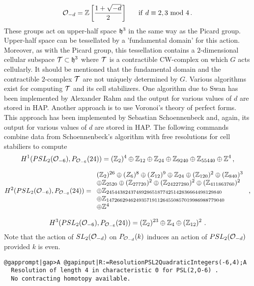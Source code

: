 \documentclass[a4paper,11pt]{report}
\begin{document}
{{\[{\cal O}_{-d} = \mathbb Z\left[\frac{1+\sqrt{-d}}{2}\right]~~~~~ {\rm if~} d
\equiv 2,3 {\rm ~mod~} 4\, .\]
 These groups act on upper-half space ${\frak h}^3$ in the same way as the Picard group. Upper-half space can be tessellated by a
'fundamental domain' for this action. Moreover, as with the Picard group, this
tessellation contains a $2$-dimensional cellular subspace ${\cal T}\subset {\frak h}^3$ where ${\cal T}$ is a contractible CW-complex on which $G$ acts cellularly. It should be mentioned that the fundamental domain and the
contractible $2$-complex ${\cal T}$ are not uniquely determined by $G$. Various algorithms exist for computing ${\cal T}$ and its cell stabilizers. One algorithm due to Swan \cite{swan} has been implemented by Alexander Rahm \cite{rahmthesis} and the output for various values of $d$ are stored in HAP. Another approach is to use Voronoi's theory of perfect
forms. This approach has been implemented by Sebastian Schoennenbeck \cite{schoennenbeck} and, again, its output for various values of $d$ are stored in HAP. The following commands combine data from Schoennenbeck's
algorithm with free resolutions for cell stabiliers to compute 
\[H^1(PSL_2({\cal O}_{-6}),P_{{\cal O}_{-6}}(24)) = (\mathbb Z_2)^4 \oplus
\mathbb Z_{12} \oplus \mathbb Z_{24} \oplus \mathbb Z_{9240} \oplus \mathbb
Z_{55440} \oplus \mathbb Z^4\,, \]
 
\[H^2(PSL_2({\cal O}_{-6}),P_{{\cal O}_{-6}}(24)) = \begin{array}{l} (\mathbb
Z_2)^{26} \oplus \mathbb (Z_{6})^8 \oplus \mathbb (Z_{12})^{9} \oplus \mathbb
Z_{24} \oplus (\mathbb Z_{120})^2 \oplus (\mathbb Z_{840})^3\\ \oplus \mathbb
Z_{2520} \oplus (\mathbb Z_{27720})^2 \oplus (\mathbb Z_{24227280})^2 \oplus
(\mathbb Z_{411863760})^2\\ \oplus \mathbb
Z_{2454438243748928651877425142836664498129840}\\ \oplus \mathbb
Z_{14726629462493571911264550857019986988779040}\\ \oplus \mathbb
Z^4\end{array}\ , \]
 
\[H^3(PSL_2({\cal O}_{-6}),P_{{\cal O}_{-6}}(24)) = (\mathbb Z_2)^{23} \oplus
\mathbb Z_{4} \oplus (\mathbb Z_{12})^2\ . \]
 Note that the action of $SL_2({\cal O}_{-d})$ on $P_{{\cal O}_{-d}}(k)$ induces an action of $PSL_2({\cal O}_{-d})$ provided $k$ is even. 
\begin{Verbatim}[commandchars=@|A,fontsize=\small,frame=single,label=Example]
  @gapprompt|gap>A @gapinput|R:=ResolutionPSL2QuadraticIntegers(-6,4);A
  Resolution of length 4 in characteristic 0 for PSL(2,O-6) . 
  No contracting homotopy available. 
  

\end{Verbatim}}}
\end{document}
